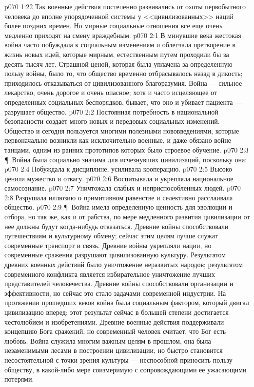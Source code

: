 \vs p070 1:22 Так военные действия постепенно развивались от охоты первобытного человека до вполне упорядоченной системы у <<цивилизованных>> наций более поздних времен. Но мирные социальные отношения все еще очень медленно приходят на смену враждебным.
\vs p070 2:1 В минувшие века жестокая война часто побуждала к социальным изменениям и облегчала претворение в жизнь новых идей, которые мирным, естественным путем проходили бы за десять тысяч лет. Страшной ценой, которая была уплачена за определенную пользу войны, было то, что общество временно отбрасывалось назад в дикость; приходилось отказываться от цивилизованного благоразумия. Война --- сильное лекарство, очень дорогое и очень опасное; хотя и часто исцеляющее от определенных социальных беспорядков, бывает, что оно и убивает пациента --- разрушает общество.
\vs p070 2:2 Постоянная потребность в национальной безопасности создает много новых и передовых социальных изменений. Общество и сегодня пользуется многими полезными нововведениями, которые первоначально возникли как исключительно военные, и даже обязано войне танцами, одним из ранних прототипов которых было строевое обучение.
\vs p070 2:3 \P\ Война была социально значима для исчезнувших цивилизаций, поскольку она:
\vs p070 2:4 \bibnobreakspace Побуждала к дисциплине, усиливала кооперацию.
\vs p070 2:5 \bibnobreakspace Высоко ценила мужество и отвагу.
\vs p070 2:6 \bibnobreakspace Воспитывала и укрепляла национальное самосознание.
\vs p070 2:7 \bibnobreakspace Уничтожала слабых и неприспособленных людей.
\vs p070 2:8 \bibnobreakspace Разрушала иллюзию о примитивном равенстве и селективно расслаивала общество.
\vs p070 2:9 \P\ Война имела определенную ценность для эволюции и отбора, но так же, как и от рабства, по мере медленного развития цивилизации от нее должны будут когда\hyp{}нибудь отказаться. Древние войны способствовали путешествиям и культурному обмену; сейчас этим целям лучше служат современные транспорт и связь. Древние войны укрепляли нации, но современные сражения разрушают цивилизованную культуру. Результатом древних военных действий было уничтожение неразвитых народов; результатом современного конфликта является избирательное уничтожение лучших представителей человечества. Древние войны способствовали организации и эффективности, но сейчас это стало задачами современной индустрии. На протяжении прошедших веков война была социальным фактором, который двигал цивилизацию вперед; этот результат сейчас в большей степени достигается честолюбием и изобретениями. Древние военные действия поддерживали концепцию Бога сражений, но современный человек считает, что Бог есть любовь. Война служила многим важным целям в прошлом, она была незаменимыми лесами в построении цивилизации, но быстро становится несостоятельной с точки зрения культуры --- неспособной приносить пользу обществу, в какой\hyp{}либо мере соизмеримую с сопровождающими ее ужасающими потерями.
